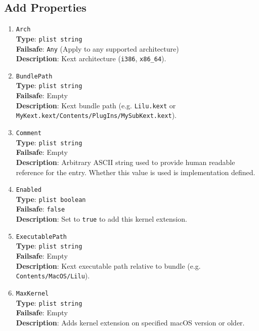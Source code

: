 \documentclass[]{article}
\makeatletter
\renewcommand{\label}[1]{%
\zref@wrapper@immediate{\oldlabel{#1}}}  %
\makeatother
\begin{document}
\subsection{Add Properties}\label{kernelpropsadd}

\begin{enumerate}

\item
  \texttt{Arch}\\
  \textbf{Type}: \texttt{plist\ string}\\
  \textbf{Failsafe}: \texttt{Any} (Apply to any supported architecture)\\
  \textbf{Description}: Kext architecture (\texttt{i386}, \texttt{x86\_64}).

\item
  \texttt{BundlePath}\\
  \textbf{Type}: \texttt{plist\ string}\\
  \textbf{Failsafe}: Empty\\
  \textbf{Description}: Kext bundle path (e.g. \texttt{Lilu.kext}
  or \texttt{MyKext.kext/Contents/PlugIns/MySubKext.kext}).

\item
  \texttt{Comment}\\
  \textbf{Type}: \texttt{plist\ string}\\
  \textbf{Failsafe}: Empty\\
  \textbf{Description}: Arbitrary ASCII string used to provide human readable
  reference for the entry. Whether this value is used is implementation defined.

\item
  \texttt{Enabled}\\
  \textbf{Type}: \texttt{plist\ boolean}\\
  \textbf{Failsafe}: \texttt{false}\\
  \textbf{Description}: Set to \texttt{true} to add this kernel extension.

\item
  \texttt{ExecutablePath}\\
  \textbf{Type}: \texttt{plist\ string}\\
  \textbf{Failsafe}: Empty\\
  \textbf{Description}: Kext executable path relative to bundle
  (e.g. \texttt{Contents/MacOS/Lilu}).

\item
  \texttt{MaxKernel}\\
  \textbf{Type}: \texttt{plist\ string}\\
  \textbf{Failsafe}: Empty\\
  \textbf{Description}: Adds kernel extension on specified macOS version or older.


\end{enumerate}
\end{document}
